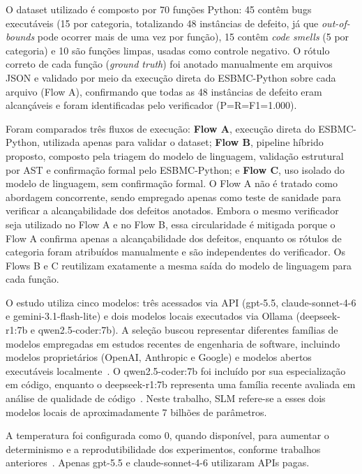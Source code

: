 \documentclass[sigconf]{acmart}
\begin{document}
O dataset utilizado é composto por 70 funções Python: 45 contêm bugs
executáveis (15 por categoria, totalizando 48 instâncias de defeito,
já que \textit{out-of-bounds} pode ocorrer mais de uma vez por
função), 15 contêm \textit{code smells} (5 por categoria) e 10 são
funções limpas, usadas como controle negativo. O rótulo correto de
cada função (\textit{ground truth}) foi anotado manualmente em arquivos
JSON e validado por meio da execução direta do ESBMC-Python sobre cada
arquivo (Flow A), confirmando que todas as 48 instâncias de defeito
eram alcançáveis e foram identificadas pelo verificador
(P=R=F1=1.000).

Foram comparados três fluxos de execução:
\textbf{Flow A}, execução direta do ESBMC-Python, utilizada apenas para
validar o dataset; \textbf{Flow B}, pipeline híbrido proposto, composto
pela triagem do modelo de linguagem, validação estrutural por AST e
confirmação formal pelo ESBMC-Python; e \textbf{Flow C}, uso isolado do
modelo de linguagem, sem confirmação formal. O Flow A não é tratado
como abordagem concorrente, sendo empregado apenas como teste de
sanidade para verificar a alcançabilidade dos defeitos anotados. Embora
o mesmo verificador seja utilizado no Flow A e no Flow B, essa
circularidade é mitigada porque o Flow A confirma apenas a
alcançabilidade dos defeitos, enquanto os rótulos de categoria foram
atribuídos manualmente e são independentes do verificador. Os Flows B e
C reutilizam exatamente a mesma saída do modelo de linguagem para cada
função.

O estudo utiliza cinco modelos: três acessados via API (gpt-5.5,
claude-sonnet-4-6 e gemini-3.1-flash-lite) e dois modelos locais
executados via Ollama (deepseek-r1:7b e qwen2.5-coder:7b). A seleção
buscou representar diferentes famílias de modelos empregadas em estudos
recentes de engenharia de software, incluindo modelos proprietários
(OpenAI, Anthropic e Google) e modelos abertos executáveis
localmente~\cite{ullah2024secllmholmes,ding2025primevul}. O qwen2.5-coder:7b foi incluído por sua especialização em código,
enquanto o deepseek-r1:7b representa uma família recente avaliada em
análise de qualidade de código~\cite{orvalho2025pyveritas,souza2026beyondstrictrules}. Neste trabalho, SLM refere-se a
esses dois modelos locais de aproximadamente 7 bilhões de parâmetros.

A temperatura foi configurada como 0, quando disponível, para aumentar
o determinismo e a reprodutibilidade dos experimentos, conforme
trabalhos anteriores~\cite{ullah2024secllmholmes,orvalho2025pyveritas}. Apenas gpt-5.5 e claude-sonnet-4-6 utilizaram APIs pagas.
\end{document}
